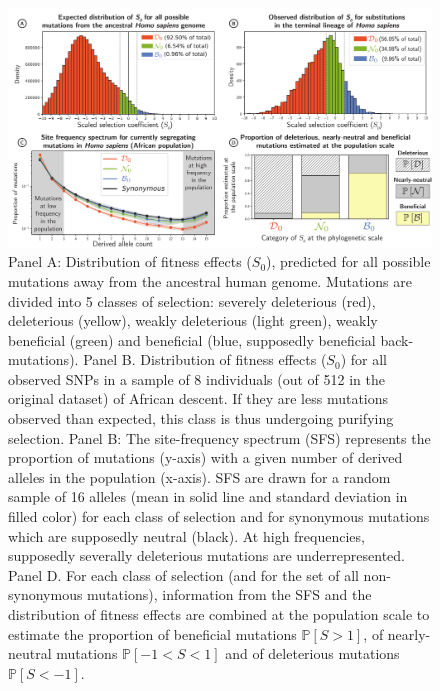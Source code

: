 \documentclass{article}
\newcommand{\proba}{\mathbb{P}}
\newcommand{\Sphy}{S_{0}}
\newcommand{\Spop}{S}
\newcommand{\polyDel}{\Spop < -1}
\newcommand{\polyNeutral}{-1 < \Spop < 1}
\newcommand{\polyAdv}{ \Spop > 1}
\newcommand{\PpolyDel}{\proba \left[ \polyDel \right]}
\newcommand{\PpolyNeutral}{\proba \left[ \polyNeutral \right]}
\newcommand{\PpolyAdv}{\proba \left[ \polyAdv \right]}
\begin{document}
    \begin{figure}[!ht]
        \centering
        \includegraphics[width=\textwidth, page=1] {artworks/figure.homo-afr-results}
        \caption{
            Panel A: Distribution of fitness effects ($\Sphy$), predicted for all possible mutations away from the ancestral human genome.
            Mutations are divided into 5 classes of selection: severely deleterious (red), deleterious (yellow), weakly deleterious (light green), weakly beneficial (green) and beneficial (blue, supposedly beneficial back-mutations).
            Panel B. Distribution of fitness effects ($\Sphy$) for all observed SNPs in a sample of 8 individuals (out of 512 in the original dataset) of African descent.
            If they are less mutations observed than expected, this class is thus undergoing purifying selection.
            Panel B: The site-frequency spectrum (SFS) represents the proportion of mutations (y-axis) with a given number of derived alleles in the population (x-axis).
            SFS are drawn for a random sample of 16 alleles (mean in solid line and standard deviation in filled color) for each class of selection and for synonymous mutations which are supposedly neutral (black).
            At high frequencies, supposedly severally deleterious mutations are underrepresented.
            Panel D. For each class of selection (and for the set of all non-synonymous mutations), information from the SFS and the distribution of fitness effects are combined at the population scale to estimate the proportion of beneficial mutations $\PpolyAdv$, of nearly-neutral mutations $\PpolyNeutral$ and of deleterious mutations $\PpolyDel$.
        }
        \label{fig:homo-afr-results}
    \end{figure}
\end{document}
